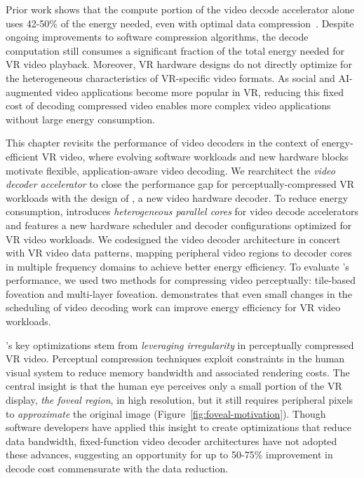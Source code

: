Prior work shows that the compute portion of the video decode accelerator alone uses 42-50\% of the energy needed, even with optimal data compression~\cite{google2018asplos, tikekar18ijssc, 8khevc-ijssc}.
Despite ongoing improvements to software compression algorithms, the decode computation still consumes a significant fraction of the total energy needed for VR video playback.
Moreover, VR hardware designs do not directly optimize for the heterogeneous characteristics of VR-specific video formats.
As social and AI-augmented video applications become more popular in VR, reducing this fixed cost of decoding compressed video enables more complex video applications without large energy consumption.

This chapter revisits the performance of video decoders in the context of energy-efficient VR video, where evolving software workloads and new hardware blocks motivate flexible, application-aware video decoding.
We rearchitect the \emph{video decoder accelerator} to close the performance gap for perceptually-compressed VR workloads with the design of \nameArch, a new video hardware decoder.
To reduce energy consumption, \nameArch introduces \emph{heterogeneous parallel cores} for video decode accelerators and features a new hardware scheduler and decoder configurations optimized for VR video workloads.
We codesigned the video decoder architecture in concert with VR video data patterns, mapping peripheral video regions to decoder cores in multiple frequency domains to achieve better energy efficiency.
To evaluate \nameArch's performance, we used two methods for compressing video perceptually: tile-based foveation and multi-layer foveation.
\nameArch demonstrates that even small changes in the scheduling of video decoding work can improve energy efficiency for VR video workloads.

\nameArch's key optimizations stem from \emph{leveraging irregularity} in perceptually compressed VR video.
Perceptual compression techniques exploit constraints in the human visual system to reduce memory bandwidth and associated rendering costs.
The central insight is that the human eye perceives only a small portion of the VR display, \emph{the foveal region}, in high resolution, but it still requires peripheral pixels to \emph{approximate} the original image (Figure~\ref{fig:foveal-motivation}).
Though software developers have applied this insight to create optimizations that reduce data bandwidth, fixed-function video decoder architectures have not adopted these advances, suggesting an opportunity for up to 50-75\% improvement in decode cost commensurate with the data reduction.

